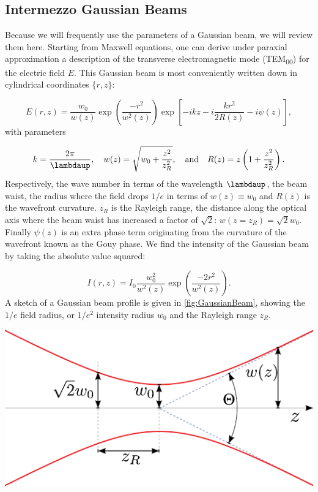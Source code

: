 \mbox{}\par
\begin{mdframed}
    \subsection*{Intermezzo Gaussian Beams}\label{sec:GaussianBeams}
    
    Because we will frequently use the parameters of a Gaussian beam, we will review them here. 
    Starting from Maxwell equations, one can derive under paraxial approximation a description of the transverse electromagnetic mode (TEM\textsubscript{00}) \cite{Leeuwen2017} for the electric field $E$.
    This Gaussian beam is most conveniently written down in cylindrical coordinates $\{r,z\}$:
    
    \begin{equation}\label{eq:GaussianBeam}
    	E(r,z) = \frac{w_0}{w(z)} \exp{\left(\frac{-r^2}{w^2(z)}\right)} \exp{\left[-ikz-i\frac{kr^2}{2R(z)} - i\psi(z)\right]},
    \end{equation}
    with parameters
    
    \begin{equation}\label{eq:GaussianBeamParameters}
    	k = \frac{2\pi}{\lambdaup}, \quad 
    	w(z) = \sqrt{w_0 + \frac{z^2}{z_R^2}}, \quad \text{and} \quad
    	R(z) = z \left(1 + \frac{z^2}{z_R^2}\right).
    \end{equation}
    Respectively, the wave number in terms of the wavelength $\lambdaup$, the beam waist, the radius where the field drops $1/e$ in terms of $w(z)\equiv w_0$ and $R(z)$ is the wavefront curvature. $z_R$ is the Rayleigh range, the distance along the optical axis where the beam waist has increased a factor of $\sqrt{2}$: $w(z=z_R) = \sqrt{2}w_0$.
    Finally $\psi(z)$ is an extra phase term originating from the curvature of the wavefront known as the Gouy phase.
    We find the intensity of the Gaussian beam by taking the absolute value squared:
    
    \begin{equation}\label{eq:GaussianBeamIntensity}
    	I(r,z) = I_0 \frac{w_0^2}{w^2(z)} \exp{\left(\frac{-2r^2}{w^2(z)}\right)}.
    \end{equation}
    A sketch of a Gaussian beam profile is given in \cref{fig:GaussianBeam}, showing the $1/e$ field radius, or $1/e^2$ intensity radius $w_0$ and the Rayleigh range $z_R$. 
    
    \vspace*{3mm}
    \centering
        \includegraphics[width=0.5\linewidth]{figures/GaussianBeam.pdf}
        \captionsetup{margin=0mm}%
        \label{fig:GaussianBeam}
\end{mdframed}

